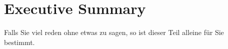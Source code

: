 \section*{Executive Summary}
Falls Sie viel reden ohne etwas zu sagen, so ist dieser Teil alleine für Sie bestimmt.